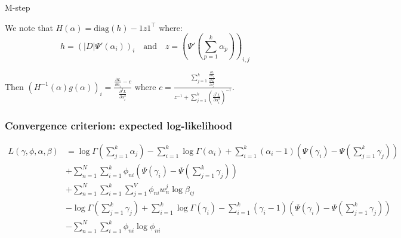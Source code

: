 \documentclass[10pt]{article}
\begin{document}
\begin{algorithm}
\caption{M-step}
\end{algorithm}

We note that $H(\alpha) = \text{diag}(h) - 1z1^{\top}$ where:
\[ h = ( |D| \Psi'(\alpha_i))_i \quad \text{and} \quad z = \left(\Psi' \left( \sum_{p=1}^k \alpha_p\right)\right)_{i, j} \]

Then $(H^{-1}(\alpha)g(\alpha))_i = \frac{\frac{\partial L}{\partial \alpha_i} -c}{ \frac{\partial^2 L}{\partial \alpha_i^2}}$ where $c = \frac{\sum_{j=1}^k \frac{\frac{\partial L}{\partial \alpha_j}}{ \frac{\partial^2 L}{\partial \alpha_j^2}}}{z^{-1}+\sum_{j=1}^k \left( \frac{\partial^2 L}{\partial \alpha_i^2}\right)^{-1}}$.

\subsubsection{Convergence criterion: expected log-likelihood}

\begin{align*}
L(\gamma, \phi, \alpha, \beta)
& = \log \Gamma\left( \sum_{j=1}^k\alpha_j \right) - \sum_{i=1}^k \log \Gamma(\alpha_i) + \sum_{i=1}^k (\alpha_i- 1) \left( \Psi(\gamma_i) - \Psi\left( \sum_{j=1}^k \gamma_j \right) \right) \\
&+ \sum_{n=1}^N\sum_{i=1}^k \phi_{ni} \left( \Psi(\gamma_i) - \Psi\left( \sum_{j=1}^k \gamma_j \right) \right) \\
&+ \sum_{n=1}^N \sum_{i=1}^k \sum_{j=1}^V \phi_{ni} w_n^j \log \beta_{ij} \\
& - \log \Gamma \left( \sum_{j=1}^k \gamma_j \right) + \sum_{i=1}^k \log \Gamma(\gamma_i) - \sum_{i=1}^k(\gamma_i - 1) \left( \Psi(\gamma_i) - \Psi\left( \sum_{j=1}^k \gamma_j \right)\right) \\
&- \sum_{n=1}^N \sum_{i=1}^k \phi_{ni}\log\phi_{ni} 
\end{align*}
\end{document}
